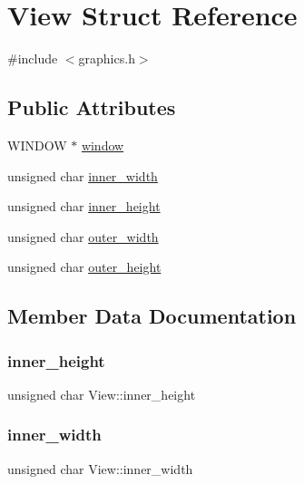 \hypertarget{structView}{}\section{View Struct Reference}
\label{structView}


{\ttfamily \#include $<$graphics.\+h$>$}

\subsection*{Public Attributes}
\begin{DoxyCompactItemize}
\item 
W\+I\+N\+D\+OW $\ast$ \hyperlink{structView_afae41b4d514883d788de11054c0a9596}{window}
\item 
unsigned char \hyperlink{structView_ad19f88e1766676afdf64e829d5120415}{inner\+\_\+width}
\item 
unsigned char \hyperlink{structView_a8085de6b2af6a9ada4df394f372d1c67}{inner\+\_\+height}
\item 
unsigned char \hyperlink{structView_adb64f0c8ad4030517a9a885b6232f60e}{outer\+\_\+width}
\item 
unsigned char \hyperlink{structView_af9ea34821bea7809441b35c2eafae471}{outer\+\_\+height}
\end{DoxyCompactItemize}


\subsection{Member Data Documentation}
\mbox{\label{structView_a8085de6b2af6a9ada4df394f372d1c67}} 
\subsubsection{\texorpdfstring{inner\+\_\+height}{inner\_height}}
{\footnotesize\ttfamily unsigned char View\+::inner\+\_\+height}

\mbox{\label{structView_ad19f88e1766676afdf64e829d5120415}} 
\subsubsection{\texorpdfstring{inner\+\_\+width}{inner\_width}}
{\footnotesize\ttfamily unsigned char View\+::inner\+\_\+width}

